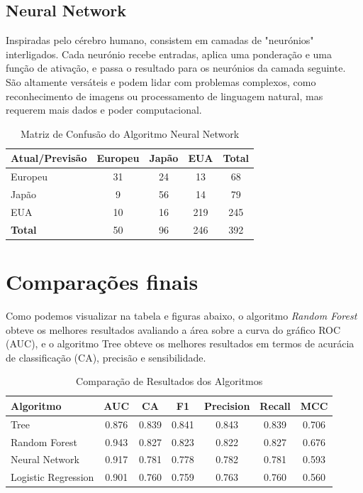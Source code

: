 \documentclass[conference]{IEEEtran}
\begin{document}
\subsection{Neural Network}
Inspiradas pelo cérebro humano, consistem em camadas de "neurónios" interligados. Cada neurónio recebe entradas, 
aplica uma ponderação e uma função de ativação, e passa o resultado para os neurónios da camada seguinte. São altamente versáteis 
e podem lidar com problemas complexos, como reconhecimento de imagens ou processamento de linguagem natural, mas requerem mais dados 
e poder computacional.
\begin{table}[!ht]
    \centering
    \begin{tabular}{lcccc}
    \toprule
    \textbf{Atual/Previsão} & \textbf{Europeu} & \textbf{Japão} & \textbf{EUA} & \textbf{Total} \\
    \midrule
    Europeu & 31 & 24 & 13 & 68 \\
    Japão  & 9 & 56 & 14 & 79 \\
    EUA    & 10 & 16 & 219 & 245 \\
    \midrule
    \textbf{Total} & 50 & 96 & 246 & 392 \\
    \bottomrule
    \end{tabular}
    \label{tab:conf_matrix_neural}
    \caption{Matriz de Confusão do Algoritmo Neural Network}
\end{table}

\section{Comparações finais}
Como podemos visualizar na tabela e figuras abaixo, o algoritmo \textit{Random Forest} obteve os melhores resultados avaliando a área sobre 
a curva do gráfico ROC (AUC), e o algoritmo Tree obteve os melhores resultados em termos de acurácia de classificação (CA), precisão e sensibilidade.
\begin{table}[!ht]
    \centering
    \begin{tabular}{lcccccc}
    \toprule
    \textbf{Algoritmo} & \textbf{AUC} & \textbf{CA} & \textbf{F1} & \textbf{Precision} & \textbf{Recall} & \textbf{MCC} \\
    \midrule
    Tree                & 0.876 & 0.839 & 0.841 & 0.843 & 0.839 & 0.706 \\
    Random Forest       & 0.943 & 0.827 & 0.823 & 0.822 & 0.827 & 0.676 \\
    Neural Network      & 0.917 & 0.781 & 0.778 & 0.782 & 0.781 & 0.593 \\
    Logistic Regression & 0.901 & 0.760 & 0.759 & 0.763 & 0.760 & 0.560 \\
    \bottomrule
    \end{tabular}
    \label{tab:evaluation_results}
    \caption{Comparação de Resultados dos Algoritmos}
\end{table}
\end{document}
